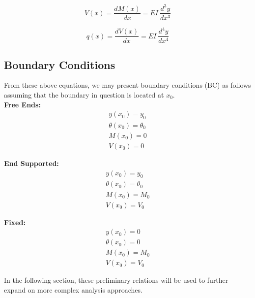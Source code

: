 \begin{equation}
	\label{eq:shr}
	V(x) = \frac{dM(x)}{dx} = EI\ \frac{d^3y}{dx^3}
\end{equation}

\begin{equation}
	\label{eq:loadintens}
	q(x) = \frac{dV(x)}{dx} = EI\ \frac{d^4y}{dx^4}
\end{equation}

\subsection{Boundary Conditions}

From these above equations, we may present boundary conditions (BC) as follows assuming that the boundary in question is located at $x_0$.\\

\textbf{Free Ends:}\\
\begin{equation}
	\label{eq:2_freeBC}
	\begin{aligned}
	y(x_0) = y_0 \\
	\theta(x_0)= \theta_0\\
	M(x_0) = 0\\
	V(x_0) = 0 
	\end{aligned}
\end{equation}

\textbf{End Supported:}\\
\begin{equation}
	\label{eq:2_endBC}
	\begin{aligned}
	y(x_0)=y_0 \\
	\theta(x_0)=\theta_0\\
	M(x_0)=M_0\\
	V(x_0) =V_0 
	\end{aligned}
\end{equation}

\textbf{Fixed:}\\
\begin{equation}
	\label{eq:2_fixedBC}
	\begin{aligned}
	y(x_0)=0 \\
	\theta(x_0)=0\\
	M(x_0)=M_0\\
	V(x_0) =V_0 
	\end{aligned}
\end{equation}

In the following section, these preliminary relations will be used to further expand on more complex analysis approaches.


